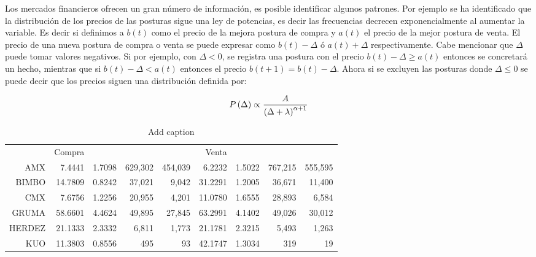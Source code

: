 \documentclass[10pt]{article}
\begin{document}
Los mercados financieros ofrecen un gran número de información, es posible identificar algunos patrones. Por ejemplo se ha identificado que la distribución de los precios de las posturas sigue una ley de potencias, es decir las frecuencias decrecen exponencialmente al aumentar la variable. Es decir si definimos a $b(t)$ como el precio de la mejora postura de compra y $a(t)$ el precio de la mejor postura de venta. El precio de una nueva postura de compra o venta se puede expresar como $b(t)-\Delta$ ó $a(t)+\Delta$ respectivamente. Cabe mencionar que $\Delta$ puede tomar valores negativos. Si por ejemplo, con $\Delta <0$, se registra una postura con el precio $b(t)-\Delta \geq a(t)$ entonces se concretará un hecho, mientras que si $b(t)-\Delta < a(t)$ entonces el precio $b(t+1)=b(t)-\Delta$. Ahora si se excluyen las posturas donde $\Delta \leq 0$ se puede decir que los precios siguen una distribución definida por:

\[
P\left(\Delta\right) \propto {{A} \over {\left(\Delta+\lambda\right)}^{\alpha+1}}
\]

\begin{table}[htbp]
  \centering
  \caption{Add caption}
    \begin{tabular}{rrrrrrrrr}
          & Compra &       &       &       & Venta &       &       &  \\
    AMX   & 7.4441 & 1.7098 & 629,302 & 454,039 & 6.2232 & 1.5022 & 767,215 & 555,595 \\
    BIMBO & 14.7809 & 0.8242 & 37,021 & 9,042 & 31.2291 & 1.2005 & 36,671 & 11,400 \\
    CMX   & 7.6756 & 1.2256 & 20,955 & 4,201 & 11.0780 & 1.6555 & 28,893 & 6,584 \\
    GRUMA & 58.6601 & 4.4624 & 49,895 & 27,845 & 63.2991 & 4.1402 & 49,026 & 30,012 \\
    HERDEZ & 21.1333 & 2.3332 & 6,811 & 1,773 & 21.1781 & 2.3215 & 5,493 & 1,263 \\
    KUO   & 11.3803 & 0.8556 & 495   & 93    & 42.1747 & 1.3034 & 319   & 19 \\
    \end{tabular}%
  \label{tab:addlabel}%
\end{table}%


\clearpage

\listoftables
\clearpage

\listoffigures
\clearpage

\nocite{*}



\end{document}
